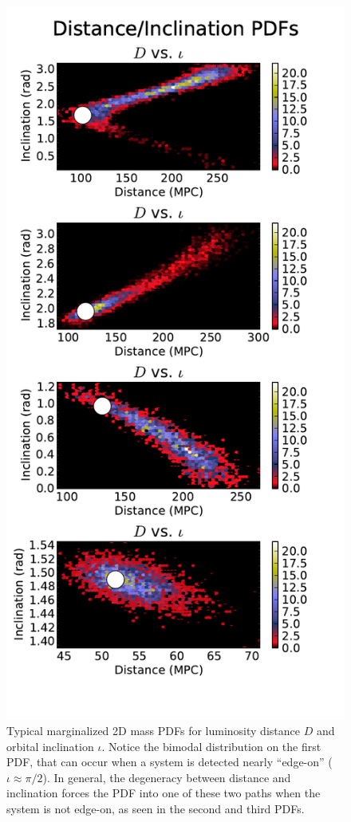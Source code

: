 \documentclass[11pt,a4paper]{emulateapj}
\begin{document}
   
\begin{figure}[h!]
  \centering
 \includegraphics[trim=0cm 0cm 0cm 0cm, clip=true,scale=0.75]{distIota2D.pdf}
 \caption{Typical marginalized 2D mass PDFs for luminosity distance $D$ and orbital inclination $\iota$. Notice the bimodal 
 distribution on the first PDF, that can occur when a system is detected nearly ``edge-on'' ($\iota \approx \pi/2$).  In general,
 the degeneracy between distance and inclination forces the PDF into one of these two paths when the system is not edge-on,
  as seen in the second and third PDFs.}
 \label{distIotaPDF}
\end{figure}
\end{document}
